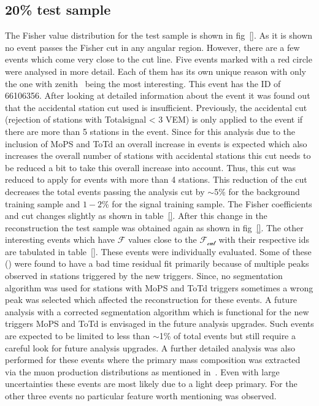 \subsection{20\% test sample}
\label{subsec:unblind_20}

The Fisher value distribution for the test sample is shown in fig~\ref{}. As it is shown no event passes the Fisher cut in any angular region. However, there are a few events which come very close to the cut line. Five events marked with a red circle were analysed in more detail. Each of them has its own unique reason with only the one with zenith~ being the most interesting. This event has the ID of 66106356. After looking at detailed information about the event it was found out that the accidental station cut used is insufficient. Previously, the  accidental cut (rejection of stations with Totalsignal < 3 VEM) is only applied to the event if there are more than 5 stations in the event. Since for this analysis due to the inclusion of MoPS and ToTd an overall increase in events is expected which also increases the overall number of stations with accidental stations this cut needs to be reduced a bit to take this overall increase into account. Thus, this cut was reduced to apply for events with more than 4 stations. This reduction of the cut decreases the total events passing the analysis cut by $\sim$5\% for the background training sample and $1-2$\% for the signal training sample. The Fisher coefficients and cut changes slightly as shown in table~\ref{}. After this change in the reconstruction the test sample was obtained again as shown in fig~\ref{}. The other interesting events which have $\mathcal{F}$ values close to the $\mathcal{F_{cut}}$ with their respective ids are tabulated in table~\ref{}. These events were individually evaluated. Some of these () were found to have a bad time residual fit primarily because of multiple peaks observed in stations triggered by the new triggers. Since, no segmentation algorithm was used for stations with MoPS and ToTd triggers sometimes a wrong peak was selected which affected the reconstruction for these events. A future analysis with a corrected segmentation algorithm which is functional for the new triggers MoPS and ToTd is envisaged in the future analysis upgrades. Such events are expected to be limited to less than $\sim$1\% of total events but still require a careful look for future analysis upgrades. A further detailed analysis was also performed for these events where the primary mass composition was extracted via the muon production distributions as mentioned in~\cite{PierreAuger:2014zay}. Even with large uncertainties these events are most likely due to a light deep primary. For the other three events no particular feature worth mentioning was observed. 


